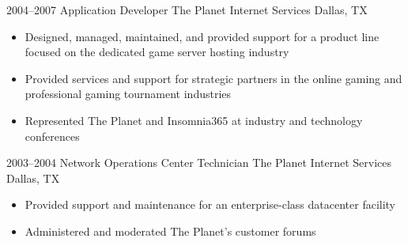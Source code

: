 \documentclass[11pt,a4paper,sans]{moderncv}
\begin{document}
        \cventry
            {2004--2007}
            {Application Developer}
            {The Planet Internet Services}
            {Dallas, TX}
            {}
            {
                \begin{itemize}
                    \item Designed, managed, maintained, and provided support for a product line focused on the dedicated game server hosting industry
                    \item Provided services and support for strategic partners in the online gaming and professional gaming tournament industries
                    \item Represented The Planet and Insomnia365 at industry and technology conferences
                \end{itemize}
            }

        \cventry
            {2003--2004}
            {Network Operations Center Technician}
            {The Planet Internet Services}
            {Dallas, TX}
            {}
            {
                \begin{itemize}
                    \item Provided support and maintenance for an enterprise-class datacenter facility
	            \item Administered and moderated The Planet's customer forums
                \end{itemize}
            }

\end{document}
